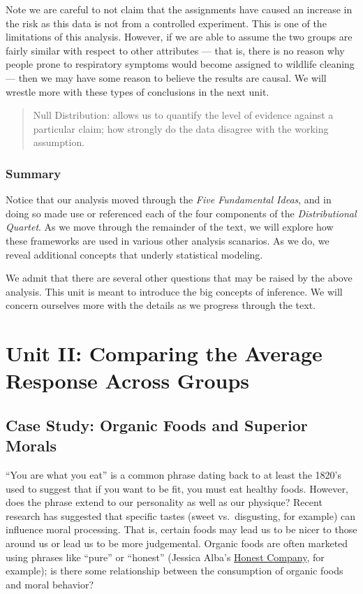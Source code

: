\documentclass[]{book}
\theoremstyle{definition}
\theoremstyle{definition}
\theoremstyle{remark}
\begin{document}
Note we are careful to not claim that the assignments have caused an
increase in the risk as this data is not from a controlled experiment.
This is one of the limitations of this analysis. However, if we are able
to assume the two groups are fairly similar with respect to other
attributes --- that is, there is no reason why people prone to
respiratory symptoms would become assigned to wildlife cleaning --- then
we may have some reason to believe the results are causal. We will
wrestle more with these types of conclusions in the next unit.

\begin{quote}
Null Distribution: allows us to quantify the level of evidence against a
particular claim; how strongly do the data disagree with the working
assumption.
\end{quote}

\section{Summary}\label{summary}

Notice that our analysis moved through the \emph{Five Fundamental
Ideas}, and in doing so made use or referenced each of the four
components of the \emph{Distributional Quartet}. As we move through the
remainder of the text, we will explore how these frameworks are used in
various other analysis scanarios. As we do, we reveal additional
concepts that underly statistical modeling.

We admit that there are several other questions that may be raised by
the above analysis. This unit is meant to introduce the big concepts of
inference. We will concern ourselves more with the details as we
progress through the text.

\part{Unit II: Comparing the Average Response Across
Groups}\label{part-unit-ii-comparing-the-average-response-across-groups}

\hypertarget{CaseOrganic}{\chapter{Case Study: Organic Foods and
Superior Morals}\label{CaseOrganic}}

``You are what you eat'' is a common phrase dating back to at least the
1820's used to suggest that if you want to be fit, you must eat healthy
foods. However, does the phrase extend to our personality as well as our
physique? Recent research has suggested that specific tastes (sweet
vs.~disgusting, for example) can influence moral processing. That is,
certain foods may lead us to be nicer to those around us or lead us to
be more judgemental. Organic foods are often marketed using phrases like
``pure'' or ``honest'' (Jessica Alba's
\href{https://www.honest.com/}{Honest Company}, for example); is there
some relationship between the consumption of organic foods and moral
behavior?
\end{document}
